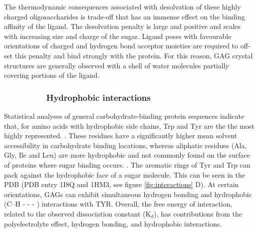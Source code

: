 \documentclass[journal=jctcce,manuscript=article]{achemso}
\begin{document}
{The thermodynamic consequences associated with desolvation of these highly charged oligosaccharides is trade-off that has an immense effect on the binding affinity of the ligand.\cite{Gandhi2009FreeInteractions, Samsonov2014FlexibilitySystems}
The desolvation penalty is large and positive and scales with increasing size and charge of the sugar.\cite{Gandhi2009FreeInteractions, Samsonov2014FlexibilitySystems} 
Ligand poses with favourable orientations of charged and hydrogen bond acceptor moieties are required to off-set this penalty and bind strongly with the protein. \cite{Bryce2001Carbohydrate-ProteinA}
For this reason, \ac{GAG} crystal structures are generally observed with a shell of water molecules partially covering portions of the ligand. \cite{Gandhi2009FreeInteractions, Capila2002Heparin-proteinInteractions.}

\subsubsection*{~~~~~~~~~Hydrophobic interactions}

Statistical analyses of general carbohydrate-binding protein sequences indicate that, for amino acids with hydrophobic side chains, Trp and Tyr are the the most highly represented. \cite{Malik2007SequenceNetwork, Sarkar2015AProteins, Shionyu-Mitsuyama2003AnProteins}. 
These residues have a significantly higher mean solvent accessibility in carbohydrate binding locations, whereas aliphatic residues (Ala, Gly, Ile and Leu) are more hydrophobic and not commonly found on the surface of proteins where sugar binding occurs. \cite{Malik2007SequenceNetwork, Shionyu-Mitsuyama2003AnProteins}. 
The aromatic rings of Tyr and Trp can pack against the hydrophobic face of a sugar molecule.\cite{Gandhi2008TheProteins} 
This can be seen in the \ac{PDB} (PDB entry 1I8Q and 1HM3, see figure \ref{fig:interactions} D). At certain orientations, \acp{GAG} can exhibit simultaneous hydrogen bonding and hydrophobic (C--H - - - \textpi) interactions with TYR.\cite{Li2001HyaluronanLyase., WeijunHuang2001ActiveMutagenesis}
Overall, the free energy of interaction, related to the observed dissociation constant (K$_{d}$), has contributions from the polyelectrolyte effect, hydrogen bonding, and hydrophobic interactions. \cite{Thompson1994EnergeticDomain}


}
\end{document}

